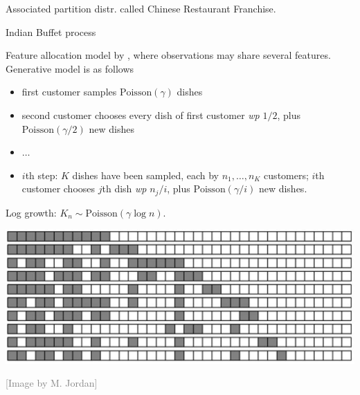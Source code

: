 	
	Associated partition distr. called \alert{Chinese Restaurant Franchise}.


{Indian Buffet process}

	Feature allocation model by  \citet{ghahramani2006infinite}, where observations may share several features. 	\alert{Generative model is as follows}
	\begin{itemize}
		\item first customer samples $\text{Poisson}(\gamma)$ dishes
		\item second customer chooses every dish of first customer \textit{wp} $1/2$, plus  $\text{Poisson}(\gamma/2)$ new dishes
		\item $\ldots$
		\item $i$th step: $K$ dishes have been sampled, each by $n_1,\ldots,n_K$ customers;  $i$th customer chooses $j$th dish  \textit{wp} $n_j/i$, plus  $\text{Poisson}(\gamma/i)$ new dishes.
	\end{itemize}
	
	\alert{Log growth}: $K_n\sim \text{Poisson}(\gamma\log n)$.
	
		\begin{center}
			\includegraphics[width=.7\textwidth]{figures_julyan/beyond_DP/IBP_draw}
		\end{center}
		\hfill\textcolor{gray}{[Image by M. Jordan]}







